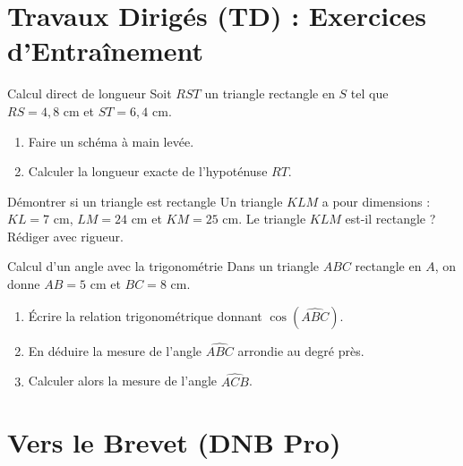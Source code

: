 \section{Travaux Dirigés (TD) : Exercices d'Entraînement}

\begin{exercice}[3 pts]{\capRealiser}{Calcul direct de longueur}
Soit $RST$ un triangle rectangle en $S$ tel que $RS = 4{,}8\text{ cm}$ et $ST = 6{,}4\text{ cm}$.
\begin{enumerate}
    \item Faire un schéma à main levée.
    \item Calculer la longueur exacte de l'hypoténuse $RT$.
\end{enumerate}
\lignesreponse[4]
\end{exercice}

\begin{exercice}[3 pts]{\capAnalyser}{Démontrer si un triangle est rectangle}
Un triangle $KLM$ a pour dimensions : $KL = 7\text{ cm}$, $LM = 24\text{ cm}$ et $KM = 25\text{ cm}$.
Le triangle $KLM$ est-il rectangle ? Rédiger avec rigueur.
\lignesreponse[4]
\end{exercice}

\begin{exercice}[4 pts]{\capRealiser}{Calcul d'un angle avec la trigonométrie}
Dans un triangle $ABC$ rectangle en $A$, on donne $AB = 5\text{ cm}$ et $BC = 8\text{ cm}$.
\begin{enumerate}
    \item Écrire la relation trigonométrique donnant $\cos(\widehat{ABC})$.
    \item En déduire la mesure de l'angle $\widehat{ABC}$ arrondie au degré près.
    \item Calculer alors la mesure de l'angle $\widehat{ACB}$.
\end{enumerate}
\lignesreponse[4]
\end{exercice}

\section{Vers le Brevet (DNB Pro)}

